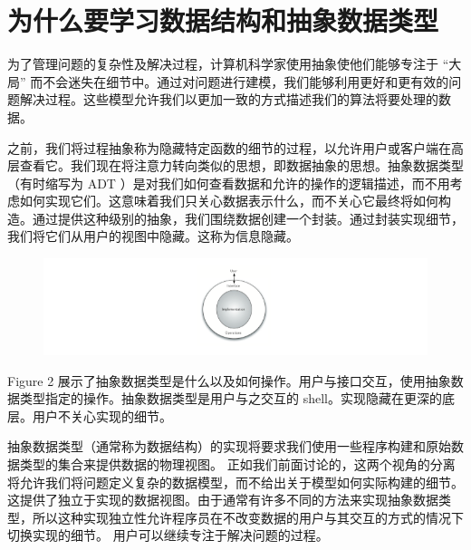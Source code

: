 \section{为什么要学习数据结构和抽象数据类型}


为了管理问题的复杂性及解决过程，计算机科学家使用抽象使他们能够专注于 “大局” 而不会迷失在细节中。通过对问题进行建模，我们能够利用更好和更有效的问题解决过程。这些模型允许我们以更加一致的方式描述我们的算法将要处理的数据。


之前，我们将过程抽象称为隐藏特定函数的细节的过程，以允许用户或客户端在高层查看它。我们现在将注意力转向类似的思想，即数据抽象的思想。抽象数据类型（有时缩写为 ADT ）是对我们如何查看数据和允许的操作的逻辑描述，而不用考虑如何实现它们。这意味着我们只关心数据表示什么，而不关心它最终将如何构造。通过提供这种级别的抽象，我们围绕数据创建一个封装。通过封装实现细节，我们将它们从用户的视图中隐藏。这称为信息隐藏。

\begin{figure}[htbp]
  \centering
  \includegraphics[width=6in]{images/ds_adt.png}
\end{figure}

Figure 2 展示了抽象数据类型是什么以及如何操作。用户与接口交互，使用抽象数据类型指定的操作。抽象数据类型是用户与之交互的 shell。实现隐藏在更深的底层。用户不关心实现的细节。 



抽象数据类型（通常称为数据结构）的实现将要求我们使用一些程序构建和原始数据类型的集合来提供数据的物理视图。 正如我们前面讨论的，这两个视角的分离将允许我们将问题定义复杂的数据模型，而不给出关于模型如何实际构建的细节。 这提供了独立于实现的数据视图。由于通常有许多不同的方法来实现抽象数据类型，所以这种实现独立性允许程序员在不改变数据的用户与其交互的方式的情况下切换实现的细节。 用户可以继续专注于解决问题的过程。
